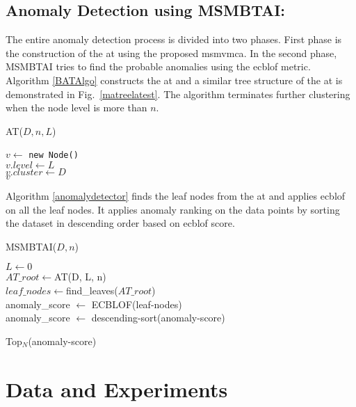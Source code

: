 \documentclass[fleqn,usenatbib]{mnras}
\begin{document}
\subsection*{Anomaly Detection using MSMBTAI:}
The entire anomaly detection process is divided into two phases. First phase is the construction of the \acrfull{at} using the proposed \acrshort{msmvmca}. In the second phase, MSMBTAI tries to find the probable anomalies using the \acrshort{ecblof} metric. Algorithm \ref{BATAlgo} constructs the \acrshort{at} and a similar tree structure of the \acrshort{at} is demonstrated in Fig.~\ref{matreelatest}. The algorithm terminates further clustering when the node level is more than $n$.
\begin{algorithm}
\caption{AT($D, n, L$)}
\label{BATAlgo}
$v\leftarrow$ {\tt new Node()}\\
$v.level\leftarrow L$\\
$v.cluster\leftarrow D$\\
\Return $v$
\end{algorithm}
Algorithm \ref{anomalydetector} finds the leaf nodes from the \acrshort{at} and applies \acrshort{ecblof} on all the leaf nodes. It applies anomaly ranking on the data points by sorting the dataset in descending order based on \acrshort{ecblof} score.
\begin{algorithm}
\caption{MSMBTAI($D,n$)}
\label{anomalydetector}
$L\leftarrow 0$ \\
$AT\_root\leftarrow$AT(D, L, n)\\
$leaf\_nodes\leftarrow$find\_leaves($AT\_root$)\\
anomaly\_score $\leftarrow$ ECBLOF(leaf-nodes)\\
anomaly\_score $\leftarrow$ descending-sort(anomaly-score)\\

\Return Top$_N$(anomaly-score)
\end{algorithm}

\section{Data and Experiments}
\end{document}
